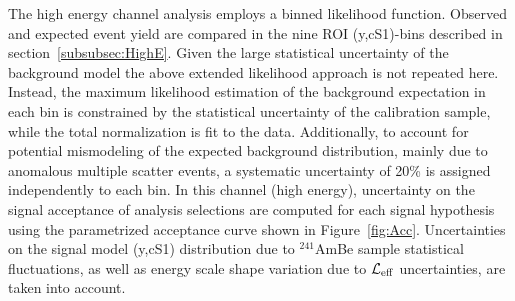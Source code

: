 The high energy channel analysis employs a binned likelihood function. Observed and expected event yield are compared in the nine ROI (y,cS1)-bins described in section~\ref{subsubsec:HighE}. 
Given the large statistical uncertainty of the background model the above extended likelihood approach is not repeated here.
Instead, the maximum likelihood estimation of the background expectation in each bin is constrained by the statistical uncertainty of the calibration sample, while the total 
normalization is fit to the data. Additionally, to account for potential mismodeling of the expected background distribution, mainly due to anomalous multiple scatter events,
a systematic uncertainty of 20\% is assigned independently to each bin. In this channel (high energy), uncertainty on the signal acceptance of analysis selections are computed for each signal hypothesis using the parametrized acceptance curve shown in Figure~\ref{fig:Acc}.
Uncertainties on the signal model (y,cS1) distribution due to $^{241}$AmBe sample statistical fluctuations, as well as energy scale shape variation due to $\mathcal{L}_{\mathrm{eff}}$ uncertainties, are taken into account.





